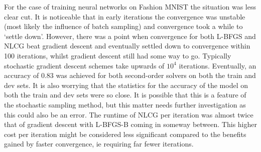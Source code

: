 \documentclass[nohyperref]{article}
\theoremstyle{plain}
\theoremstyle{definition}
\theoremstyle{remark}
\begin{document}
For the case of training neural networks on Fashion MNIST the situation was less clear cut. It is noticeable that in early iterations the convergence was unstable (most likely the influence of batch sampling) and convergence took a while to `settle down'. However, there was a point when convergence for both L-BFGS and NLCG beat gradient descent and eventually settled down to convergence within 100 iterations, whilst gradient descent still had some way to go. Typically stochastic gradient descent schemes take upwards of $10^4$ iterations. Eventually, an accuracy of $0.83$ was achieved for both second-order solvers on both the train and dev sets. It is also worrying that the statistics for the accuracy of the model on both the train and dev sets were so close. It is possible that this is a feature of the stochastic sampling method, but this matter needs further investigation as this could also be an error. The runtime of NLCG per iteration was almost twice that of gradient descent with L-BFGS-B coming in someway between. This higher cost per iteration might be considered less significant compared to the benefits gained by faster convergence, ie requiring far fewer iterations.

%
%
\end{document}
